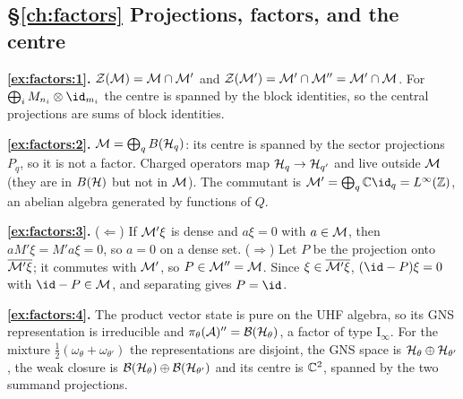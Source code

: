 {\subsection*{\S\ref{ch:factors} Projections, factors, and the centre}
\textbf{\ref{ex:factors:1}.} $\mathcal{Z}(\mathcal{M})=\mathcal{M}\cap\mathcal{M}'$ and $\mathcal{Z}(\mathcal{M}')=\mathcal{M}'\cap\mathcal{M}''=\mathcal{M}'\cap\mathcal{M}$. For $\bigoplus_iM_{n_i}\otimes\id_{m_i}$ the centre is spanned by the block identities, so the central projections are sums of block identities.\par
\textbf{\ref{ex:factors:2}.} $\mathcal{M}=\bigoplus_qB(\mathcal{H}_q)$: its centre is spanned by the sector projections $P_q$, so it is not a factor. Charged operators map $\mathcal{H}_q\to\mathcal{H}_{q'}$ and live outside $\mathcal{M}$ (they are in $B(\mathcal{H})$ but not in $\mathcal{M}$). The commutant is $\M'=\bigoplus_q\C\id_q=L^\infty(\Z)$, an abelian algebra generated by functions of $Q$.\par
\textbf{\ref{ex:factors:3}.} ($\Leftarrow$) If $\mathcal{M}'\xi$ is dense and $a\xi=0$ with $a\in\mathcal{M}$, then $aM'\xi=M'a\xi=0$, so $a=0$ on a dense set. ($\Rightarrow$) Let $P$ be the projection onto $\overline{\mathcal{M}'\xi}$; it commutes with $\mathcal{M}'$, so $P\in\mathcal{M}''=\mathcal{M}$. Since $\xi\in\overline{\mathcal{M}'\xi}$, $(\id-P)\xi=0$ with $\id-P\in\M$, and separating gives $P=\id$.\par
\textbf{\ref{ex:factors:4}.} The product vector state is pure on the UHF algebra, so its GNS representation is irreducible and $\pi_\theta(\mathcal{A})''=\mathcal{B}(\mathcal{H}_\theta)$, a factor of type I$_\infty$. For the mixture $\frac12(\omega_\theta+\omega_{\theta'})$ the representations are disjoint, the GNS space is $\mathcal{H}_\theta\oplus\mathcal{H}_{\theta'}$, the weak closure is $\mathcal{B}(\mathcal{H}_\theta)\oplus\mathcal{B}(\mathcal{H}_{\theta'})$ and its centre is $\mathbb{C}^2$, spanned by the two summand projections.\par

}
